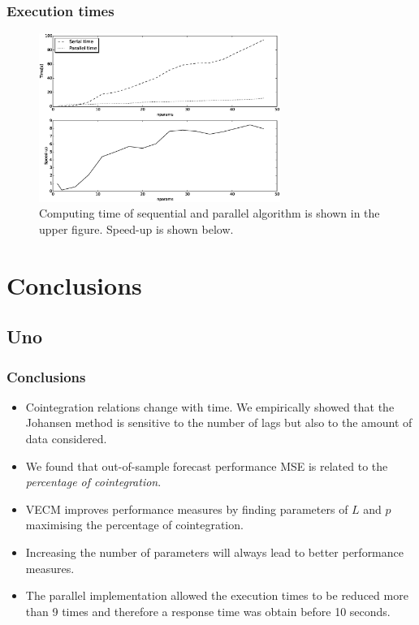 \documentclass{beamer}
\begin{document}
%
\begin{frame}
\frametitle{Execution times}
\begin{figure}[ht]
  \centering
  \includegraphics[width=0.7\textwidth]{img/51_Fig3}
  \caption[Computing time and Speed-up]{Computing time of sequential and parallel algorithm is shown in the
  upper figure. Speed-up is shown below.}
  \label{fig:extimes}
\end{figure}
\end{frame}


\section{Conclusions}
\subsection{Uno}
\begin{frame}
\frametitle{Conclusions}
\begin{itemize}
\item Cointegration relations change with time. We empirically showed that the Johansen method is sensitive to the number of lags but also to the amount of data considered.
\item We found that out-of-sample forecast performance MSE is related to the {\em percentage of cointegration\/}.  
\item VECM improves performance measures by finding
parameters of $L$ and $p$ maximising the percentage of cointegration.
\item Increasing the number of parameters will always lead to
better performance measures.
\item The parallel implementation allowed the execution times to be reduced
more than 9 times and therefore a response time was obtain before 10
seconds. 
\end{itemize}
\end{frame}
\end{document}
